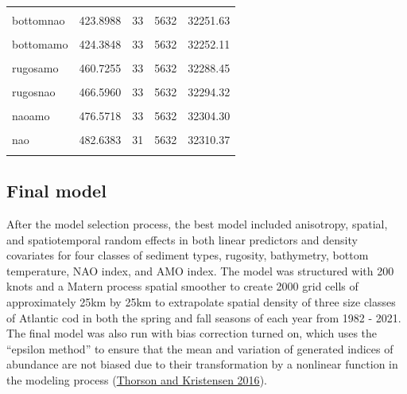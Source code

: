 \documentclass[
]{article}
\let\origtable\table
\let\endorigtable\endtable
\renewenvironment{table}[1][2] {
    \expandafter\origtable\expandafter[H]
} {
    \endorigtable
}
\begin{document}
\begin{table}[H]
\begin{tabular}[t]{lrrrr}
\cellcolor{gray!10}{rugosbottomnaoamo} & \cellcolor{gray!10}{407.5113} & \cellcolor{gray!10}{37} & \cellcolor{gray!10}{5632} & \cellcolor{gray!10}{32235.24}\\
bottomnao & 423.8988 & 33 & 5632 & 32251.63\\
\cellcolor{gray!10}{bottom} & \cellcolor{gray!10}{423.9570} & \cellcolor{gray!10}{31} & \cellcolor{gray!10}{5632} & \cellcolor{gray!10}{32251.69}\\
bottomamo & 424.3848 & 33 & 5632 & 32252.11\\
\addlinespace
\cellcolor{gray!10}{bottomnaoamo} & \cellcolor{gray!10}{424.7147} & \cellcolor{gray!10}{35} & \cellcolor{gray!10}{5632} & \cellcolor{gray!10}{32252.44}\\
rugosamo & 460.7255 & 33 & 5632 & 32288.45\\
\cellcolor{gray!10}{rugosnaoamo} & \cellcolor{gray!10}{460.7792} & \cellcolor{gray!10}{35} & \cellcolor{gray!10}{5632} & \cellcolor{gray!10}{32288.51}\\
rugosnao & 466.5960 & 33 & 5632 & 32294.32\\
\cellcolor{gray!10}{rugos} & \cellcolor{gray!10}{467.3466} & \cellcolor{gray!10}{31} & \cellcolor{gray!10}{5632} & \cellcolor{gray!10}{32295.08}\\
\addlinespace
naoamo & 476.5718 & 33 & 5632 & 32304.30\\
\cellcolor{gray!10}{amo} & \cellcolor{gray!10}{476.6922} & \cellcolor{gray!10}{31} & \cellcolor{gray!10}{5632} & \cellcolor{gray!10}{32304.42}\\
nao & 482.6383 & 31 & 5632 & 32310.37\\
\cellcolor{gray!10}{base} & \cellcolor{gray!10}{483.6222} & \cellcolor{gray!10}{29} & \cellcolor{gray!10}{5632} & \cellcolor{gray!10}{32311.35}\\
\bottomrule
\end{tabular}
\end{table}

\hypertarget{final-model}{%
\subsection{Final model}\label{final-model}}

After the model selection process, the best model included anisotropy, spatial, and spatiotemporal random effects in both linear predictors and density covariates for four classes of sediment types, rugosity, bathymetry, bottom temperature, NAO index, and AMO index. The model was structured with 200 knots and a Matern process spatial smoother to create 2000 grid cells of approximately 25km by 25km to extrapolate spatial density of three size classes of Atlantic cod in both the spring and fall seasons of each year from 1982 - 2021. The final model was also run with bias correction turned on, which uses the ``epsilon method'' to ensure that the mean and variation of generated indices of abundance are not biased due to their transformation by a nonlinear function in the modeling process (\protect\hyperlink{ref-thorson_2016}{Thorson and Kristensen 2016}).
\end{document}

